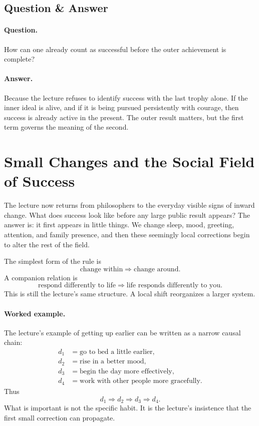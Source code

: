 \subsection{Question \& Answer}

\paragraph{Question.} How can one already count as successful before the outer achievement is complete?

\paragraph{Answer.} Because the lecture refuses to identify success with the last trophy alone. If the inner ideal is alive, and if it is being pursued persistently with courage, then success is already active in the present. The outer result matters, but the first term governs the meaning of the second.

\section{Small Changes and the Social Field of Success}

The lecture now returns from philosophers to the everyday visible signs of inward change. What does success look like before any large public result appears? The answer is: it first appears in little things. We change sleep, mood, greeting, attention, and family presence, and then these seemingly local corrections begin to alter the rest of the field.

The simplest form of the rule is
\begin{equation}
\text{change within} \Rightarrow \text{change around}.
\end{equation}
A companion relation is
\begin{equation}
\text{respond differently to life} \Rightarrow \text{life responds differently to you}.
\end{equation}
This is still the lecture's same structure. A local shift reorganizes a larger system.

\paragraph{Worked example.} The lecture's example of getting up earlier can be written as a narrow causal chain:
\begin{align}
d_1 &= \text{go to bed a little earlier},\\
d_2 &= \text{rise in a better mood},\\
d_3 &= \text{begin the day more effectively},\\
d_4 &= \text{work with other people more gracefully}.
\end{align}
Thus
\begin{equation}
d_1 \Rightarrow d_2 \Rightarrow d_3 \Rightarrow d_4.
\end{equation}
What is important is not the specific habit. It is the lecture's insistence that the first small correction can propagate.

